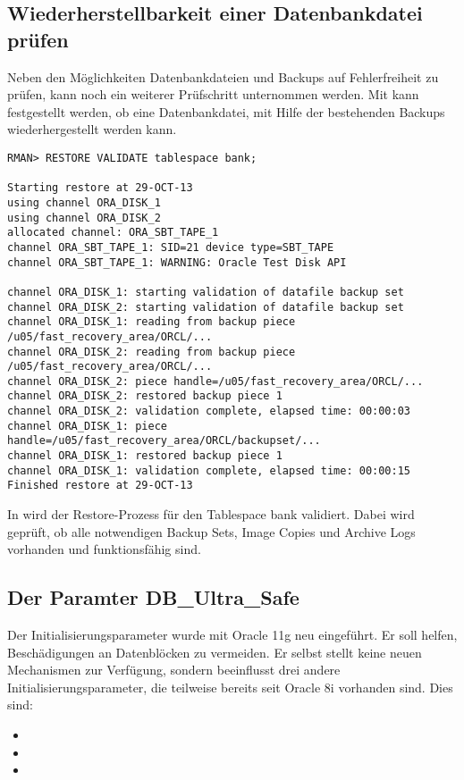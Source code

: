       \subsection{Wiederherstellbarkeit einer Datenbankdatei prüfen}
        Neben den Möglichkeiten Datenbankdateien und Backups auf Fehlerfreiheit zu prüfen, kann noch ein weiterer Prüfschritt unternommen werden. Mit  kann festgestellt werden, ob eine Datenbankdatei, mit Hilfe der bestehenden Backups wiederhergestellt werden kann.
        \begin{lstlisting}[caption={Kann der Tablespace \identifier{bank} wiederhergestellt werden?},label=admin1404,language=rman]
RMAN> RESTORE VALIDATE tablespace bank;

Starting restore at 29-OCT-13
using channel ORA_DISK_1
using channel ORA_DISK_2
allocated channel: ORA_SBT_TAPE_1
channel ORA_SBT_TAPE_1: SID=21 device type=SBT_TAPE
channel ORA_SBT_TAPE_1: WARNING: Oracle Test Disk API

channel ORA_DISK_1: starting validation of datafile backup set
channel ORA_DISK_2: starting validation of datafile backup set
channel ORA_DISK_1: reading from backup piece /u05/fast_recovery_area/ORCL/...
channel ORA_DISK_2: reading from backup piece /u05/fast_recovery_area/ORCL/...
channel ORA_DISK_2: piece handle=/u05/fast_recovery_area/ORCL/...
channel ORA_DISK_2: restored backup piece 1
channel ORA_DISK_2: validation complete, elapsed time: 00:00:03
channel ORA_DISK_1: piece handle=/u05/fast_recovery_area/ORCL/backupset/...
channel ORA_DISK_1: restored backup piece 1
channel ORA_DISK_1: validation complete, elapsed time: 00:00:15
Finished restore at 29-OCT-13
        \end{lstlisting}
        In  wird der Restore-Prozess für den Tablespace bank validiert. Dabei wird geprüft, ob alle notwendigen Backup Sets, Image Copies und Archive Logs vorhanden und funktionsfähig sind.
      \subsection{Der Paramter DB\_Ultra\_Safe}
        Der Initialisierungsparameter  wurde mit Oracle 11g neu eingeführt. Er soll helfen, Beschädigungen an Datenblöcken zu vermeiden. Er selbst stellt keine neuen Mechanismen zur Verfügung, sondern beeinflusst drei andere Initialisierungsparameter, die teilweise bereits seit Oracle 8i vorhanden sind. Dies sind:
        \begin{itemize}
          \item {}
          \item {}
          \item {}
        \end{itemize}
